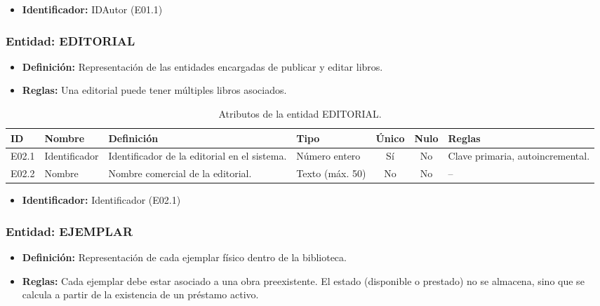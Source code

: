 \begin{itemize}
	\item\textbf{Identificador:} IDAutor (E01.1)
\end{itemize}

\subsubsection{Entidad: EDITORIAL}
\begin{itemize}
	\item\textbf{Definición:} Representación de las entidades encargadas de publicar y editar libros.
	\item\textbf{Reglas:} Una editorial puede tener múltiples libros asociados.
\end{itemize}

\begin{table}[H]
	\centering
	\caption{Atributos de la entidad EDITORIAL.}
	\label{tab:dict_editorial}
	\small
	\begin{tabularx}{\textwidth}{l l X l c c X}
		\toprule
		\textbf{ID} & \textbf{Nombre} & \textbf{Definición} & \textbf{Tipo} & \textbf{Único} & \textbf{Nulo} & \textbf{Reglas} \\
		\midrule
		E02.1 & Identificador & Identificador de la editorial en el sistema. & Número entero & Sí & No & Clave primaria, autoincremental. \\
		\addlinespace
		E02.2 & Nombre & Nombre comercial de la editorial. & Texto (máx. 50) & No & No & -- \\
		\bottomrule
	\end{tabularx}
\end{table}

\begin{itemize}
	\item\textbf{Identificador:} Identificador (E02.1)
\end{itemize}

\subsubsection{Entidad: EJEMPLAR}
\begin{itemize}
	\item\textbf{Definición:} Representación de cada ejemplar físico dentro de la biblioteca.
	\item\textbf{Reglas:} Cada ejemplar debe estar asociado a una obra preexistente. El estado (disponible o prestado) no se almacena, sino que se calcula a partir de la existencia de un préstamo activo.
\end{itemize}

